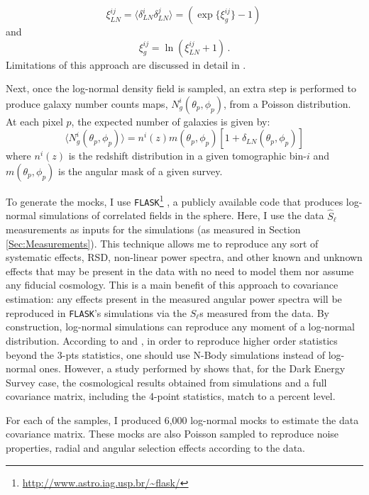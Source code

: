 \begin{equation}
\xi^{ij}_{LN} = \langle \delta_{LN}^i \delta_{LN}^j\rangle =  \left(\exp\{\xi^{ij}_{g} \} -1 \right) \,
\end{equation}
and
\begin{equation}
\xi^{ij}_{g} = \ln\left( \xi^{ij}_{LN} + 1 \right)    \, .
\end{equation}
Limitations of this approach are discussed in detail in \cite{Flask2016}.

\qquad Next, once the log-normal density field is sampled, an extra step is performed to produce galaxy number counts maps, $N^i_g(\theta_p, \phi_p)$, from a Poisson distribution. At each pixel $p$, the expected number of galaxies is given by:
\begin{equation}
    \langle N^i_g(\theta_p, \phi_p) \rangle = n^i(z)m(\theta_p, \phi_p)[1+\delta_{LN}(\theta_p, \phi_p)]
\end{equation}
where $n^i(z)$ is the redshift distribution in a given tomographic bin-$i$ and $m(\theta_p, \phi_p)$ is the angular mask of a given survey. 

\qquad To generate the mocks, I use \texttt{FLASK}\footnote{\url{http://www.astro.iag.usp.br/~flask/}} \citep{Flask2016}, a publicly available code that produces log-normal simulations of correlated fields in the sphere. Here, I use the data $\hat{S}_{\ell}$ measurements as inputs for the simulations (as measured in Section \ref{Sec:Measurements}). This technique allows me to reproduce any sort of systematic effects, RSD, non-linear power spectra, and other known and unknown effects that may be present in the data with no need to model them nor assume any fiducial cosmology. This is a main benefit of this approach to covariance estimation: any effects present in the measured angular power spectra will be reproduced in \texttt{FLASK}'s simulations via the $S_{\ell}$s measured from the data. By construction, log-normal simulations can reproduce any moment of a log-normal distribution. According to \cite{1991-ColesJones} and \cite{Flask2016}, in order to reproduce higher order statistics beyond the 3-pts statistics, one should use N-Body simulations instead of log-normal ones. However, a study performed by \cite{2017DES-Multiprobe} shows that, for the Dark Energy Survey case, the cosmological results obtained from \flask simulations and a full covariance matrix, including the 4-point statistics, match to a percent level.

\qquad For each of the samples, I produced 6,000 log-normal mocks to estimate the data covariance matrix. These mocks are also Poisson sampled to reproduce noise properties, radial and angular selection effects according to the data. 

